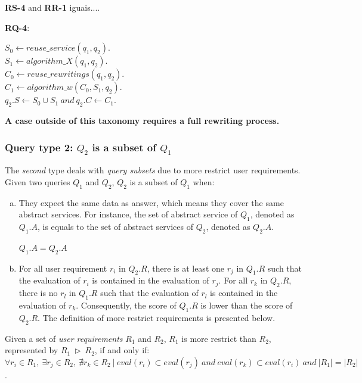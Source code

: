 \begin{definition}
\textbf{RS-4} and \textbf{RR-1} iguais....
\end{definition}

\begin{definition}
\textbf{RQ-4}:
\begin{flushleft}
$ S_{0} \leftarrow reuse\_service (q_{1}, q_{2})$. \\
$ S_{1} \leftarrow algorithm\_X (q_{1}, q_{2})$. \\
$ C_{0} \leftarrow reuse\_rewritings (q_{1}, q_{2})$. \\
$ C_{1} \leftarrow algorithm\_w (C_{0}, S_{1}, q_{2})$. \\
$ q_{2}.S \leftarrow S_{0} \cup S_{1}\ and\ q_{2}.C \leftarrow C_{1}$.
\end{flushleft}
\end{definition}

\textbf{A case outside of this taxonomy requires a full rewriting process.}

\subsubsection{Query type 2: $Q_{2}$ is a subset of $Q_{1}$}

The \textit{second} type deals with \textit{query subsets} due to more restrict user requirements. Given two queries $Q_{1}$ and $Q_{2}$, $Q_{2}$ is a subset of $Q_{1}$ when:
%
\begin{enumerate}[a)]
\item They expect the same data as answer, which means they cover the same abstract services. 
For instance, the set of abstract service of $Q_{1}$, denoted as $Q_{1}.A$, is equals to the set of abstract services of $Q_{2}$, denoted as $Q_{2}.A$.
%
\begin{center}
$Q_{1}.A = Q_{2}.A$
\end{center}
%
\item For all user requirement $r_{i}$ in $Q_{2}.R$, there is at least one $r_{j}$ in $Q_{1}.R$ such that the evaluation of $r_{i}$ is contained in the evaluation of $r_{j}$. 
For all $r_{k}$ in $Q_{2}.R$, there is no $r_{l}$ in $Q_{1}.R$ such that the evaluation of $r_{l}$ is contained in the evaluation of $r_{k}$. 
Consequently, the score of $Q_{1}.R$ is lower than the score of $Q_{2}.R$. The definition of more restrict requirements is presented below.
\end{enumerate}

\begin{definition}\label{def:reqmore}
Given a set of \textsl{user requirements} $R_{1}$ and $R_{2}$, $R_{1}$ is more restrict than $R_{2}$, represented by $R_{1} \ \rhd \ R_{2}$, if and only if: $\forall r_{i} \in R_{1}, \ \exists r_{j} \in R_{2}, \ \nexists r_{k} \in R_{2} \ \vert \ eval (r_{i}) \subset eval(r_{j}) \ and \ eval (r_{k}) \subset eval(r_{i}) \ and \ \vert R_{1} \vert = \vert R_{2} \vert$.
\end{definition}

